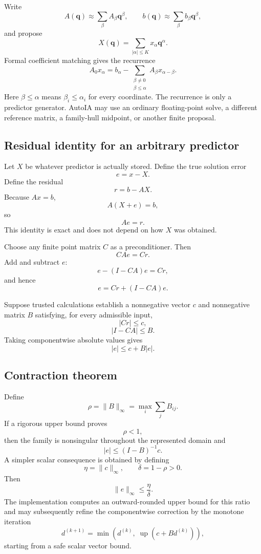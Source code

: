 \documentclass[11pt]{article}
\newcommand{\up}{\operatorname{up}}
\newcommand{\qv}{\mathbf{q}}
\begin{document}
Write
\[
  A(\qv)\approx\sum_\beta A_\beta\qv^\beta,
  \qquad
  b(\qv)\approx\sum_\beta b_\beta\qv^\beta,
\]
and propose
\[
  X(\qv)=\sum_{|\alpha|\le K}x_\alpha\qv^\alpha.
\]
Formal coefficient matching gives the recurrence
\[
  \boxed{
  A_0x_\alpha
  =
  b_\alpha
  -
  \sum_{\substack{\beta\ne0\\\beta\le\alpha}}
      A_\beta x_{\alpha-\beta}.
  }
\]
Here \(\beta\le\alpha\) means \(\beta_i\le\alpha_i\) for every coordinate.
The recurrence is only a predictor generator.  AutoIA may use an ordinary
floating-point solve, a different reference matrix, a family-hull midpoint, or
another finite proposal.

\subsection{Residual identity for an arbitrary predictor}

Let \(X\) be whatever predictor is actually stored.  Define the true solution
error
\[
  e=x-X.
\]
Define the residual
\[
  r=b-AX.
\]
Because \(Ax=b\),
\[
  A(X+e)=b,
\]
so
\[
  \boxed{Ae=r.}
\]
This identity is exact and does not depend on how \(X\) was obtained.

Choose any finite point matrix \(C\) as a preconditioner.  Then
\[
  CAe=Cr.
\]
Add and subtract \(e\):
\[
  e-(I-CA)e=Cr,
\]
and hence
\[
  \boxed{
  e=Cr+(I-CA)e.
  }
\]

Suppose trusted calculations establish a nonnegative vector \(c\) and
nonnegative matrix \(B\) satisfying, for every admissible input,
\[
  |Cr|\le c,
\]
\[
  |I-CA|\le B.
\]
Taking componentwise absolute values gives
\[
  |e|\le c+B|e|.
\]

\subsection{Contraction theorem}

Define
\[
  \rho=\|B\|_\infty=\max_i\sum_jB_{ij}.
\]
If a rigorous upper bound proves
\[
  \boxed{\rho<1,}
\]
then the family is nonsingular throughout the represented domain and
\[
  \boxed{
  |e|\le(I-B)^{-1}c.
  }
\]
A simpler scalar consequence is obtained by defining
\[
  \eta=\|c\|_\infty,
  \qquad
  \delta=1-\rho>0.
\]
Then
\[
  \|e\|_\infty\le\frac{\eta}{\delta}.
\]
The implementation computes an outward-rounded upper bound for this ratio and
may subsequently refine the componentwise correction by the monotone iteration
\[
  d^{(k+1)}=\min\left(d^{(k)},\;\up(c+Bd^{(k)})\right),
\]
starting from a safe scalar vector bound.
\end{document}

